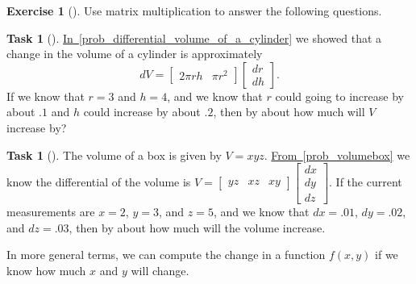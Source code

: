\documentclass[10pt,]{book}
\theoremstyle{plain}
\theoremstyle{definition}
\theoremstyle{definition}
\theoremstyle{definition}
\theoremstyle{definition}
\newtheorem{exploration}[project]{Exercise}
\newtheorem{task}[project]{Task}
\theoremstyle{definition}
\numberwithin{equation}{section}
\newcommand{\amp}{&}
\begin{document}
\begin{exploration}[]\label{exploration-134}
Use matrix multiplication to answer the following questions.%
\begin{task}[]\label{task-279}
\hyperref[prob_differential_volume_of_a_cylinder]{In~\ref{prob_differential_volume_of_a_cylinder}} we showed that a change in the volume of a cylinder is approximately%
\begin{equation*}
dV = \begin{bmatrix}2\pi rh\amp  \pi r^2
\end{bmatrix} \begin{bmatrix}dr\\dh
\end{bmatrix} .
\end{equation*}
If we know that \(r=3\) and \(h=4\), and we know that \(r\) could going to increase by about \(.1\) and \(h\) could increase by about \(.2\), then by about how much will \(V\) increase by?%
\end{task}
\begin{task}[]\label{task-280}
The volume of a box is given by \(V=xyz\). \hyperref[prob_volumebox]{From~\ref{prob_volumebox}} we know the differential of the volume is \(V=\begin{bmatrix}yz\amp  xz \amp  xy
\end{bmatrix} \begin{bmatrix}dx\\dy\\dz
\end{bmatrix}\). If the current measurements are \(x=2\), \(y=3\), and \(z=5\), and we know that \(dx=.01\), \(dy=.02\), and \(dz=.03\), then by about how much will the volume increase.%
\end{task}
\end{exploration}
In more general terms, we can compute the change in a function \(f(x,y)\) if we know how much \(x\) and \(y\) will change.%
\end{document}

